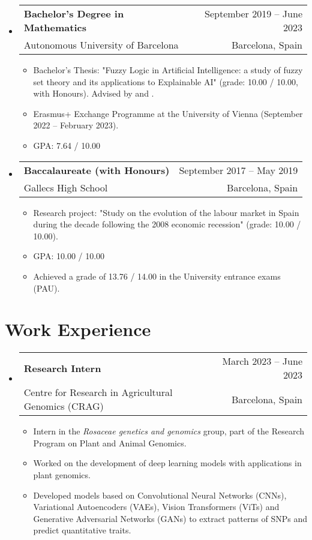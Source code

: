 \documentclass[a4paper,10pt]{article}
\makeatletter
\newcommand{\resumeQuadHeading}[4]{
  \item
  \begin{tabular*}{0.96\textwidth}[t]{l@{\extracolsep{\fill}}r}
    \textbf{#1} & \small #2 \\
    \small#3 & \small #4 \\
  \end{tabular*}
}
\newcommand{\resumeHeadingListStart}{
  \begin{itemize}[leftmargin=0.15in, label={}]
}
\newcommand{\resumeHeadingListEnd}{\end{itemize}}
\makeatother
\begin{document}
    \resumeHeadingListStart{}
      \resumeQuadHeading{Bachelor's Degree in Mathematics}{September 2019 – June 2023}
      {Autonomous University of Barcelona}{Barcelona, Spain}
      \begin{itemize}[leftmargin=3em, itemsep=0.1em, topsep=2pt]
          \item \small Bachelor's Thesis: "Fuzzy Logic in Artificial Intelligence: a study of fuzzy set theory and its applications to Explainable AI" (grade: 10.00 / 10.00, with Honours). Advised by  \href{https://www.iiia.csic.es/es/people/person/?person_id=35}{} and \href{https://mat.uab.cat/~pitsch/}{}.
          \item \small Erasmus+ Exchange Programme at the University of Vienna (September 2022 – February 2023).
          \item \small GPA: 7.64 / 10.00
      \end{itemize}
    \resumeHeadingListEnd{}
  
  \resumeHeadingListStart{}
    \resumeQuadHeading{Baccalaureate (with Honours)}{September 2017 – May 2019}
    {Gallecs High School}{Barcelona, Spain}
    \begin{itemize}[leftmargin=3em, itemsep=0.1em, topsep=2pt]
      \item \small Research project: "Study on the evolution of the labour market in Spain during the decade following the 2008 economic recession" (grade: 10.00 / 10.00).
      \item \small GPA: 10.00 / 10.00
      \item \small Achieved a grade of 13.76 / 14.00 in the University entrance exams (PAU).
    \end{itemize}
  \resumeHeadingListEnd{}


\section{Work Experience}
  \resumeHeadingListStart{}
    \resumeQuadHeading{Research Intern}{March 2023 – June 2023}
    {Centre for Research in Agricultural Genomics (CRAG)}{Barcelona, Spain}
    \begin{itemize}[leftmargin=3em, itemsep=0.1em, topsep=2pt]
      \item \small Intern in the \textit{Rosaceae genetics and genomics} group, part of the Research Program on Plant and Animal Genomics.
      \item \small Worked on the development of deep learning models with applications in plant genomics. 
      \item \small Developed models based on Convolutional Neural Networks (CNNs), Variational Autoencoders (VAEs), Vision Transformers (ViTs) and Generative Adversarial Networks (GANs) to extract patterns of SNPs and predict quantitative traits.
    \end{itemize}
  \resumeHeadingListEnd{}
\end{document}
